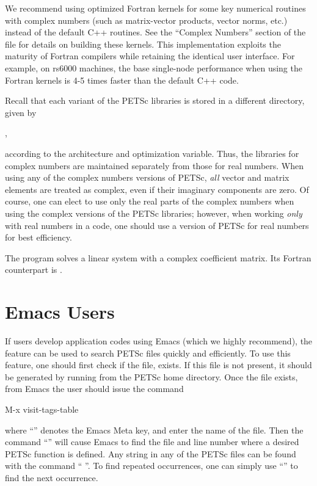 {{{We recommend using optimized Fortran kernels for some key numerical
routines with complex numbers (such as matrix-vector products, vector
norms, etc.) instead of the default C++ routines.  See the ``Complex
Numbers'' section of the file  for
details on building these kernels.  This implementation exploits the
maturity of Fortran compilers while retaining the identical user
interface.  For example, on rs6000 machines, the base single-node
performance when using the Fortran kernels is 4-5 times faster than
the default C++ code.


Recall that each variant of the PETSc libraries is stored in a
different directory, given by
\begin{tabbing}
  ,
\end{tabbing}
according to the architecture and  optimization variable. Thus, the
libraries for complex
numbers are maintained separately from those for real
numbers.  When using any of the complex numbers versions of PETSc,
{\em all} vector and matrix elements are treated as complex,
even if their imaginary components are zero.
Of course, one can elect to use only the real parts of the complex
numbers when using the complex versions of the PETSc libraries;
however, when working {\em only} with real numbers in a code,
one should use a version of PETSc for real numbers for best efficiency.

The program 
solves a linear system with a complex
coefficient matrix.  Its Fortran counterpart is
.

\section{Emacs Users}  \label{sec_emacs}

 
If users develop application codes  using Emacs (which we
highly recommend), the  feature can be used to search PETSc 
files quickly and efficiently.  To use this feature, one should 
first check if the file,
 exists.  If this file is
not present, it should be generated by
running   from the PETSc home directory. 
Once the file exists, from 
Emacs the user should issue
the command 
\begin{tabbing}
 M-x visit-tags-table
\end{tabbing}
 where ``''
denotes the Emacs Meta key, and enter the 
name of the  file. Then the command ``'' will cause Emacs 
to find the file and line number where a desired PETSc function 
is defined.  Any string in any of the PETSc files can be found with the 
command `` ''. To find repeated occurrences, 
one can simply use ``'' to find the next occurrence.


}}}
